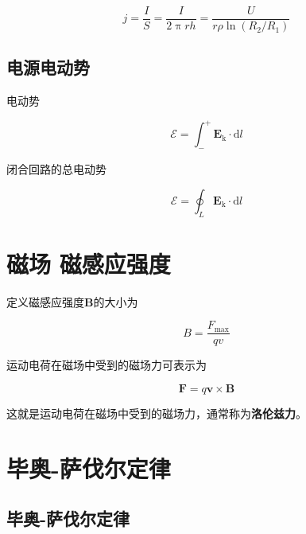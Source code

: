 \documentclass[
	12pt, %
	a4paper, %
]{myLegrandOrangeBook}
\newcommand{\rmd}{\mathrm{d}}
\begin{document}
\begin{equation*}
    j = \frac{I}{S} = \frac{I}{2 \uppi r h} = \frac{U}{r \rho \ln(R_2/R_1)}
\end{equation*}

\subsection{电源\quad 电动势}

电动势

\begin{equation}
    \mathcal{E} = \int_{-}^{+} \mathbf{E}_{\text{k}} \cdot \rmd l
\end{equation}

闭合回路的总电动势

\begin{equation}
    \mathcal{E} = \oint_L \mathbf{E}_{\text{k}} \cdot \rmd l
\end{equation}

\section{磁场 \quad 磁感应强度}

定义磁感应强度\(\mathbf{B}\)的大小为

\begin{equation}
    B = \frac{F_{\text{max}}}{qv}
\end{equation}

运动电荷在磁场中受到的磁场力可表示为

\begin{equation}
    \mathbf{F} = q \mathbf{v} \times \mathbf{B}
\end{equation}

这就是运动电荷在磁场中受到的磁场力，通常称为\textbf{洛伦兹力}。

\section{毕奥-萨伐尔定律}

\subsection{毕奥-萨伐尔定律}
\end{document}
